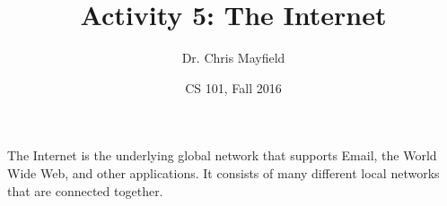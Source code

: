 \documentclass[12pt]{article}
\title{Activity 5: The Internet}
\author{Dr. Chris Mayfield}
\date{CS 101, Fall 2016}
\begin{document}
\maketitle

The Internet is the underlying global network that supports Email, the World Wide Web, and other applications. It consists of many different local networks that are connected together.


\newpage

\end{document}
